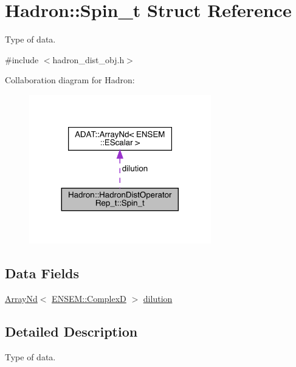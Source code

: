 \hypertarget{structHadron_1_1HadronDistOperatorRep__t_1_1Spin__t}{}\section{Hadron\+:\+:Spin\+\_\+t Struct Reference}
\label{structHadron_1_1HadronDistOperatorRep__t_1_1Spin__t}


Type of data.  




{\ttfamily \#include $<$hadron\+\_\+dist\+\_\+obj.\+h$>$}



Collaboration diagram for Hadron\+:\nopagebreak
\begin{figure}[H]
\begin{center}
\leavevmode
\includegraphics[width=224pt]{d3/d36/structHadron_1_1HadronDistOperatorRep__t_1_1Spin__t__coll__graph}
\end{center}
\end{figure}
\subsection*{Data Fields}
\begin{DoxyCompactItemize}
\item 
\mbox{\hyperlink{classADAT_1_1ArrayNd}{Array\+Nd}}$<$ \mbox{\hyperlink{group__defs_gaf38ee8c84f090ee0c3b76e7a384fb316}{E\+N\+S\+E\+M\+::\+ComplexD}} $>$ \mbox{\hyperlink{structHadron_1_1HadronDistOperatorRep__t_1_1Spin__t_a91819e69f7bb0289f5ad487af94bed39}{dilution}}
\end{DoxyCompactItemize}


\subsection{Detailed Description}
Type of data. 

